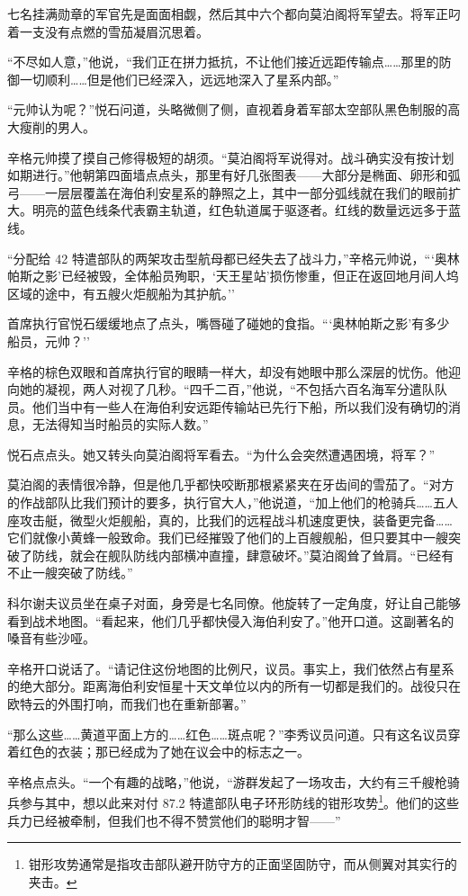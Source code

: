 \documentclass[AutoFakeBold=true]{book}
\begin{document}
七名挂满勋章的军官先是面面相觑，然后其中六个都向莫泊阁将军望去。将军正叼着一支没有点燃的雪茄凝眉沉思着。

``不尽如人意，''他说，``我们正在拼力抵抗，不让他们接近远距传输点……那里的防御一切顺利……但是他们已经深入，远远地深入了星系内部。''

``元帅认为呢？''悦石问道，头略微侧了侧，直视着身着军部太空部队黑色制服的高大瘦削的男人。

辛格元帅摸了摸自己修得极短的胡须。``莫泊阁将军说得对。战斗确实没有按计划如期进行。''他朝第四面墙点点头，那里有好几张图表——大部分是椭面、卵形和弧弓——一层层覆盖在海伯利安星系的静照之上，其中一部分弧线就在我们的眼前扩大。明亮的蓝色线条代表霸主轨道，红色轨道属于驱逐者。红线的数量远远多于蓝线。

``分配给 42 特遣部队的两架攻击型航母都已经失去了战斗力，''辛格元帅说，```奥林帕斯之影'已经被毁，全体船员殉职，`天王星站'损伤惨重，但正在返回地月间人坞区域的途中，有五艘火炬舰船为其护航。''

首席执行官悦石缓缓地点了点头，嘴唇碰了碰她的食指。```奥林帕斯之影'有多少船员，元帅？''

辛格的棕色双眼和首席执行官的眼睛一样大，却没有她眼中那么深层的忧伤。他迎向她的凝视，两人对视了几秒。``四千二百，''他说，``不包括六百名海军分遣队队员。他们当中有一些人在海伯利安远距传输站已先行下船，所以我们没有确切的消息，无法得知当时船员的实际人数。''

悦石点点头。她又转头向莫泊阁将军看去。``为什么会突然遭遇困境，将军？''

莫泊阁的表情很冷静，但是他几乎都快咬断那根紧紧夹在牙齿间的雪茄了。``对方的作战部队比我们预计的要多，执行官大人，''他说道，``加上他们的枪骑兵……五人座攻击艇，微型火炬舰船，真的，比我们的远程战斗机速度更快，装备更完备……它们就像小黄蜂一般致命。我们已经摧毁了他们的上百艘舰船，但只要其中一艘突破了防线，就会在舰队防线内部横冲直撞，肆意破坏。''莫泊阁耸了耸肩。``已经有不止一艘突破了防线。''

科尔谢夫议员坐在桌子对面，身旁是七名同僚。他旋转了一定角度，好让自己能够看到战术地图。``看起来，他们几乎都快侵入海伯利安了。''他开口道。这副著名的嗓音有些沙哑。

辛格开口说话了。``请记住这份地图的比例尺，议员。事实上，我们依然占有星系的绝大部分。距离海伯利安恒星十天文单位以内的所有一切都是我们的。战役只在欧特云的外围打响，而我们也在重新部署。''

``那么这些……黄道平面上方的……红色……斑点呢？''李秀议员问道。只有这名议员穿着红色的衣装；那已经成为了她在议会中的标志之一。

辛格点点头。``一个有趣的战略，''他说，``游群发起了一场攻击，大约有三千艘枪骑兵参与其中，想以此来对付 87.2 特遣部队电子环形防线的钳形攻势\footnote{钳形攻势通常是指攻击部队避开防守方的正面坚固防守，而从侧翼对其实行的夹击。}。他们的这些兵力已经被牵制，但我们也不得不赞赏他们的聪明才智——''
\end{document}
